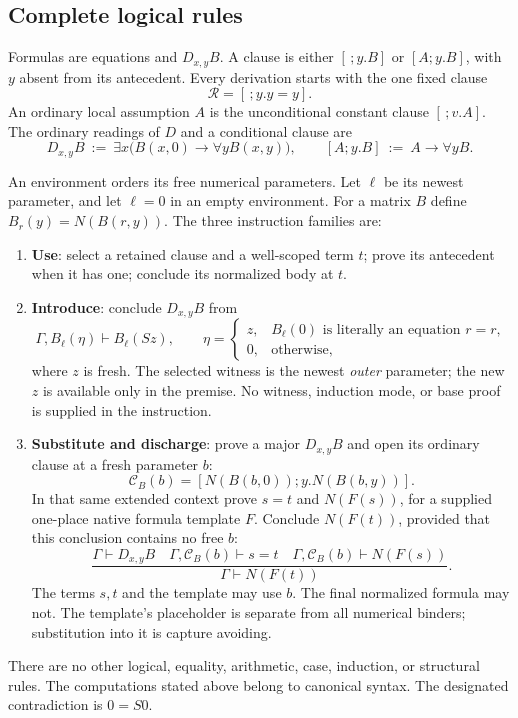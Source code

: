 \documentclass[11pt]{article}
\theoremstyle{definition}\newtheorem{definition}[theorem]{Definition}
\theoremstyle{remark}\newtheorem{remark}[theorem]{Remark}
\begin{document}
\subsection{Complete logical rules}

Formulas are equations and $D_{x,y}B$.  A clause is either $[\,;y.B]$
or $[A;y.B]$, with $y$ absent from its antecedent.  Every derivation starts
with the one fixed clause
\[
                        \mathcal R=[\,;y.y=y].
\]
An ordinary local assumption $A$ is the unconditional constant clause
$[\,;v.A]$.  The ordinary readings of $D$ and a conditional clause are
\[
 D_{x,y}B\ :=\ \exists x\bigl(B(x,0)\to\forall y B(x,y)\bigr),
 \qquad [A;y.B]\ :=\ A\to\forall yB.
\]

An environment orders its free numerical parameters.  Let $\ell$ be its
newest parameter, and let $\ell=0$ in an empty environment.  For a matrix
$B$ define $B_r(y)=N(B(r,y))$.  The three instruction families are:
\begin{enumerate}
\item \textbf{Use}: select a retained clause and a well-scoped term $t$;
prove its antecedent when it has one; conclude its normalized body at $t$.
\item \textbf{Introduce}: conclude $D_{x,y}B$ from
\[
 \Gamma,B_\ell(\eta)\vdash B_\ell(Sz),
 \qquad
 \eta=\begin{cases}
 z,&B_\ell(0)\text{ is literally an equation }r=r,\\
 0,&\text{otherwise},
 \end{cases}
 \tag{I}\label{eq:new-i}
\]
where $z$ is fresh.  The selected witness is the newest \emph{outer}
parameter; the new $z$ is available only in the premise.  No witness,
induction mode, or base proof is supplied in the instruction.
\item \textbf{Substitute and discharge}: prove a major $D_{x,y}B$ and
open its ordinary clause at a fresh parameter $b$:
\[
             \mathcal C_B(b)=[N(B(b,0));y.N(B(b,y))].
\]
In that same extended context prove $s=t$ and $N(F(s))$, for a supplied
one-place native formula template $F$.  Conclude $N(F(t))$, provided that
this conclusion contains no free $b$:
\[
 \frac{\Gamma\vdash D_{x,y}B\quad
       \Gamma,\mathcal C_B(b)\vdash s=t\quad
       \Gamma,\mathcal C_B(b)\vdash N(F(s))}
      {\Gamma\vdash N(F(t))}.
 \tag{E}\label{eq:new-e}
\]
The terms $s,t$ and the template may use $b$.  The final normalized
formula may not.  The template's placeholder is separate from all
numerical binders; substitution into it is capture avoiding.
\end{enumerate}
There are no other logical, equality, arithmetic, case, induction, or
structural rules.  The computations stated above belong to canonical
syntax.  The designated contradiction is $0=S0$.
\end{document}
